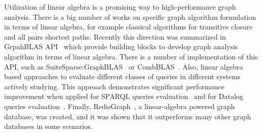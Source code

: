 Utilization of linear algebra is a promising way to high-performance graph analysis.
There is a big number of works on specific graph algorithm formulation in terms of linear algebra, for example classical algorithms for transitive closure and all pairs shortest paths.
Recently this direction was summarized in GrpahBLAS API~\cite{7761646} which provide building blocks to develop graph analysis algorithm in terms of linear algebra. 
There is a number of implementation of this API, such as SuiteSparse:GraphBLAS~\cite{10.1145/3322125} or CombBLAS~\cite{10.1177/1094342011403516}.
Also, linear algebra based approaches to evaluate different classes of queries in different systems actively studying. This approach demonstrates significant performance improvement when applied for SPARQL queries evaluation~\cite{10.1145/3302424.3303962,DBLP:journals/corr/MetzlerM15a} and for Datalog queries evaluation~\cite{sato_2017}.
Finally, RedisGraph~\cite{8778293}, a linear-algebra powered graph database, was created, and it was shown that it outperforms many other graph databases in some scenarios. 
